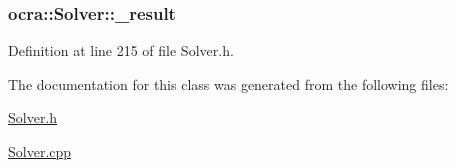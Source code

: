 \subsubsection[{\texorpdfstring{\+\_\+result}{_result}}]{ ocra\+::\+Solver\+::\+\_\+result\hspace{0.3cm}{\ttfamily [protected]}}\hypertarget{classocra_1_1Solver_abe284a585b558a2c11a8b99cb7a410da}{}\label{classocra_1_1Solver_abe284a585b558a2c11a8b99cb7a410da}


Definition at line 215 of file Solver.\+h.



The documentation for this class was generated from the following files\+:\begin{DoxyCompactItemize}
\item 
\hyperlink{Solver_8h}{Solver.\+h}\item 
\hyperlink{Solver_8cpp}{Solver.\+cpp}\end{DoxyCompactItemize}
